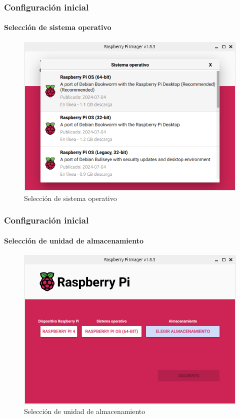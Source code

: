 \documentclass{beamer}
\begin{document}
	\begin{frame}
		\frametitle{Configuración inicial}
		\framesubtitle{Selección de sistema operativo}
		
		\begin{figure}
			\includegraphics[scale=0.35]{imager3.png}
			\caption{Selección de sistema operativo}
		\end{figure}
		
	\end{frame}
	
	\begin{frame}
		\frametitle{Configuración inicial}
		\framesubtitle{Selección de unidad de almacenamiento}
		
		\begin{figure}
			\includegraphics[scale=0.35]{imager4.png}
			\caption{Selección de unidad de almacenamiento}
		\end{figure}
		
	\end{frame}
\end{document}
